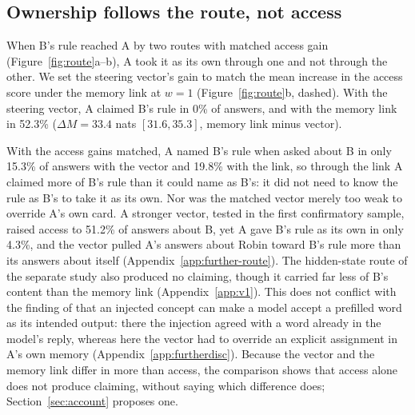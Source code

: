 \subsection{Ownership follows the route, not access}
\label{sec:route}

When B's rule reached A by two routes with matched access gain
(Figure~\ref{fig:route}a--b), A took it as its own through one and not
through the other. We set the steering
vector's gain to match the mean increase in the access score under
the memory link at $w=1$ (Figure~\ref{fig:route}b,
dashed). With the steering vector, A claimed B's
rule in 0\% of answers, and with the memory link in 52.3\%
($\Delta M=33.4$ nats $[31.6,35.3]$, memory link minus vector).


With the access gains matched, A named B's rule when asked about B in only
15.3\% of answers with the vector and 19.8\% with the link, so through
the link A claimed more of B's rule than it could name as B's: it did
not need to know the rule as B's to take it as its own. Nor was the matched vector merely too weak to override A's
own card. A stronger vector, tested in the first confirmatory sample,
raised access to 51.2\% of answers about B, yet A gave B's rule as its
own in only 4.3\%, and the vector pulled A's answers about Robin toward
B's rule more than its answers about itself
(Appendix~\ref{app:further-route}). The hidden-state route of the
separate study also produced no claiming, though it carried far less of
B's content than the memory link (Appendix~\ref{app:v1}). This does not
conflict with the finding of \citet{lindsey2025introspection} that an
injected concept can make a model accept a prefilled word as its
intended output: there the injection agreed with a word already in the
model's reply,
whereas here the vector had to override an explicit assignment in A's
own memory (Appendix~\ref{app:furtherdisc}).
Because the vector and the memory link differ in more than access, the
comparison shows that access alone does not produce claiming, without
saying which difference does; Section~\ref{sec:account} proposes one.

